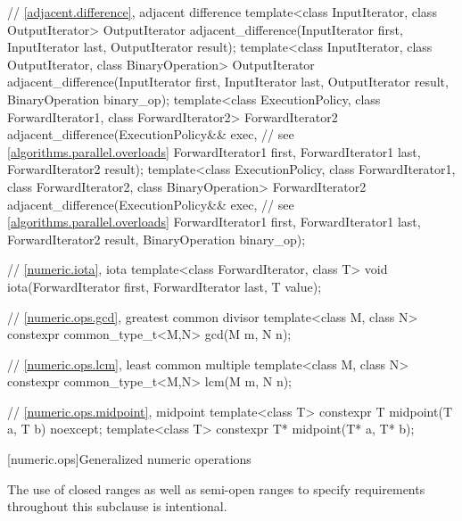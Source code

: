 \begin{codeblock}
{  // \ref{adjacent.difference}, adjacent difference
  template<class InputIterator, class OutputIterator>
    OutputIterator adjacent_difference(InputIterator first,
                                       InputIterator last,
                                       OutputIterator result);
  template<class InputIterator, class OutputIterator, class BinaryOperation>
    OutputIterator adjacent_difference(InputIterator first,
                                       InputIterator last,
                                       OutputIterator result,
                                       BinaryOperation binary_op);
  template<class ExecutionPolicy, class ForwardIterator1, class ForwardIterator2>
    ForwardIterator2 adjacent_difference(ExecutionPolicy&& exec, // see \ref{algorithms.parallel.overloads}
                                         ForwardIterator1 first,
                                         ForwardIterator1 last,
                                         ForwardIterator2 result);
  template<class ExecutionPolicy, class ForwardIterator1, class ForwardIterator2,
           class BinaryOperation>
    ForwardIterator2 adjacent_difference(ExecutionPolicy&& exec, // see \ref{algorithms.parallel.overloads}
                                         ForwardIterator1 first,
                                         ForwardIterator1 last,
                                         ForwardIterator2 result,
                                         BinaryOperation binary_op);

  // \ref{numeric.iota}, iota
  template<class ForwardIterator, class T>
    void iota(ForwardIterator first, ForwardIterator last, T value);

  // \ref{numeric.ops.gcd}, greatest common divisor
  template<class M, class N>
    constexpr common_type_t<M,N> gcd(M m, N n);

  // \ref{numeric.ops.lcm}, least common multiple
  template<class M, class N>
    constexpr common_type_t<M,N> lcm(M m, N n);

  // \ref{numeric.ops.midpoint}, midpoint
  template<class T>
    constexpr T midpoint(T a, T b) noexcept;
  template<class T>
    constexpr T* midpoint(T* a, T* b);
}
\end{codeblock}

[numeric.ops]{Generalized numeric operations}

\pnum
\begin{note}
The use of closed ranges as well as semi-open ranges
to specify requirements throughout this subclause is intentional.
\end{note}

